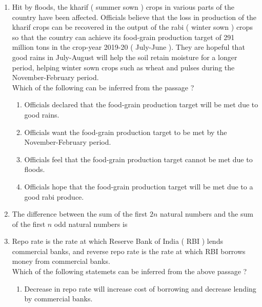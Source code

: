 \documentclass[journal]{IEEEtran}
\begin{document}
\begin{enumerate}
\begin{enumerate}
		\end{enumerate}
	\item Hit by floods, the kharif ( summer sown ) crops in various parts of the country have been affected. Officials believe that the loss in production of the kharif crops can be recovered in the output of the rabi ( winter sown ) crops so that the country can achieve its food-grain production target of 291 million tons in the crop-year 2019-20 ( July-June ). They are hopeful that good rains in July-August will help the soil retain moisture for a longer period, helping winter sown crops such as wheat and pulses during the November-February period. \\
		Which of the following can be inferred from the passage ?
		\begin{enumerate}
			\item Officials declared that the food-grain production target will be met due to good rains.
			\item Officials want the food-grain production target to be met by the November-February period.
			\item Officials feel that the food-grain production target cannot be met due to floods.
			\item Officials hope that the food-grain production target will be met due to a good rabi produce.
		\end{enumerate}
	\item The difference between the sum of the first $2n$ natural numbers and the sum of the first $n$ odd natural numbers is
		\begin{enumerate}
		\end{enumerate}
	\item Repo rate is the rate at which Reserve Bank of India ( RBI ) lends commercial banks, and reverse repo rate is the rate at which RBI borrows money from commercial banks. \\
		Which of the following statemets can be inferred from the above passage ?
		\begin{enumerate}
			\item Decrease in repo rate will increase cost of borrowing and decrease lending by commercial banks.

\end{enumerate}
\end{enumerate}
\end{document}
